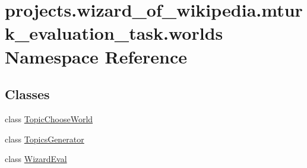 \hypertarget{namespaceprojects_1_1wizard__of__wikipedia_1_1mturk__evaluation__task_1_1worlds}{}\section{projects.\+wizard\+\_\+of\+\_\+wikipedia.\+mturk\+\_\+evaluation\+\_\+task.\+worlds Namespace Reference}
\label{namespaceprojects_1_1wizard__of__wikipedia_1_1mturk__evaluation__task_1_1worlds}
\subsection*{Classes}
\begin{DoxyCompactItemize}
\item 
class \hyperlink{classprojects_1_1wizard__of__wikipedia_1_1mturk__evaluation__task_1_1worlds_1_1TopicChooseWorld}{Topic\+Choose\+World}
\item 
class \hyperlink{classprojects_1_1wizard__of__wikipedia_1_1mturk__evaluation__task_1_1worlds_1_1TopicsGenerator}{Topics\+Generator}
\item 
class \hyperlink{classprojects_1_1wizard__of__wikipedia_1_1mturk__evaluation__task_1_1worlds_1_1WizardEval}{Wizard\+Eval}
\end{DoxyCompactItemize}
